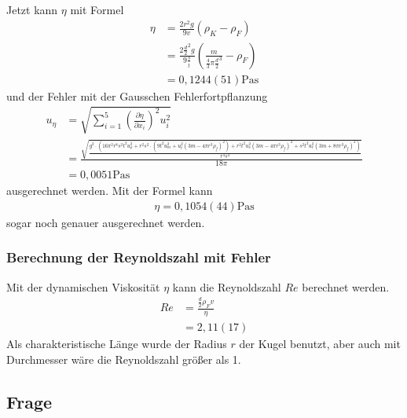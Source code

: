 \documentclass[11pt, a4paper]{article}
\begin{document}
    Jetzt kann $\eta$ mit Formel \cite[(11)]{VIS}
    \begin{align}
        \eta &= \frac{2r^2g}{9v}(\rho_K - \rho_F)  \nonumber \\
        &= \frac{2\frac{d}{2}^2g}{9\frac{s}{\bar{t}}}(\frac{m}{\frac{4}{3} \pi \frac{d}{2}^3} - \rho_F) \nonumber \\
        &= 0,1244(51) \si{\pascal\second}
    \end{align}
    und der Fehler mit der Gausschen Fehlerfortpflanzung \cite{ABW}
    \begin{align}
        u_{\eta} &= \sqrt{\sum^5_{i = 1}\left(\frac{\partial \eta}{\partial x_i}\right)^2 u_i^2} \\
        &= \frac{\sqrt{\frac{g^{2} \cdot \left(16 \pi^{2} r^{8} s^{2} t^{2} u_{\rho}^{2} + r^{2} s^{2} \cdot \left(9 t^{2} u_{m}^{2} + u_{t}^{2} \left(3 m - 4 \pi r^{3} \rho_{f}\right)^{2}\right) + r^{2} t^{2} u_{s}^{2} \left(3 m - 4 \pi r^{3} \rho_{f}\right)^{2} + s^{2} t^{2} u_{r}^{2} \left(3 m + 8 \pi r^{3} \rho_{f}\right)^{2}\right)}{r^{4} s^{4}}}}{18 \pi} \\
        &= 0,0051 \si{\pascal\second}
    \end{align}
    ausgerechnet werden.
    Mit der Formel \cite[(12)]{VIS} kann
    \begin{align}
        \eta = 0,1054(44) \si{\pascal\second}
    \end{align}
    sogar noch genauer ausgerechnet werden.
    \subsubsection{Berechnung der Reynoldszahl mit Fehler} \label{sec:reynolds}
    Mit der dynamischen Viskosität $\eta$ kann die Reynoldszahl $Re$ berechnet werden.
    \begin{align}
        Re &= \frac{\frac{d}{2} \rho_F v}{\eta} \nonumber \\
            &= 2,11(17)
    \end{align}
    Als charakteristische Länge wurde der Radius $r$ der Kugel benutzt, aber auch mit Durchmesser
    wäre die Reynoldszahl größer als 1.
    \subsection{Frage}
\end{document}
